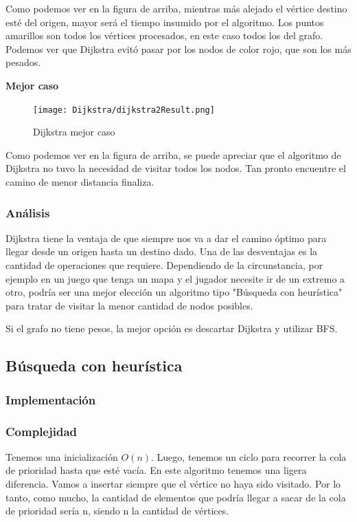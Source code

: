 Como podemos ver en la figura de arriba, mientras más alejado el vértice destino esté del origen, mayor será el tiempo insumido por el algoritmo. Los puntos amarillos son todos los vértices procesados, en este caso todos los del grafo. Podemos ver que Dijkstra evitó pasar por los nodos de color rojo, que son los más pesados.

\textbf{Mejor caso}
\begin{figure}[H]
\centering
\texttt{[image: Dijkstra/dijkstra2Result.png]}
\caption{Dijkstra mejor caso}
\end{figure}
Como podemos ver en la figura de arriba, se puede apreciar que el algoritmo de Dijkstra no tuvo la necesidad de visitar todos los nodos. Tan pronto encuentre el camino de menor distancia finaliza.

\subsubsection{Análisis}
Dijkstra tiene la ventaja de que siempre nos va a dar el camino óptimo para llegar desde un origen hasta un destino dado. Una de las desventajas es la cantidad de operaciones que requiere. Dependiendo de la circunstancia, por ejemplo en un juego que tenga un mapa y el jugador necesite ir de un extremo a otro, podría ser una mejor elección un algoritmo tipo "Búsqueda con heurística" para tratar de visitar la menor cantidad de nodos posibles.

Si el grafo no tiene pesos, la mejor opción es descartar Dijkstra y utilizar BFS.

\newpage

\subsection{Búsqueda con heurística}
\subsubsection{Implementación}

\subsubsection{Complejidad}

Tenemos una inicialización $O(n)$. Luego, tenemos un ciclo para recorrer la cola de prioridad hasta que esté vacía. En este algoritmo tenemos una ligera diferencia. Vamos a insertar siempre que el vértice no haya sido visitado. Por lo tanto, como mucho, la cantidad de elementos que podría llegar a sacar de la cola de prioridad sería n, siendo n la cantidad de vértices.

